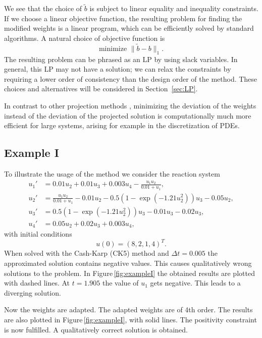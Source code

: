 \documentclass[a4paper]{article}
\numberwithin{equation}{section}
\theoremstyle{plain}
\theoremstyle{definition}
\numberwithin{theorem}{section}
\newcommand{\dt}{{\Delta t}}
\newcommand{\1}{\mathbbm{1}}
\newcommand{\bt}{\tilde{b}}
\begin{document}
We see that the choice of $\bt$ is subject to linear equality and inequality
constraints.  If we choose a linear objective function, the resulting problem
for finding the modified weights is a linear program, which can be efficiently
solved by standard algorithms.  A natural choice of objective function is
$$
\text{minimize } \|\bt - b\|_1.
$$
The resulting problem can be phrased as an LP by using slack variables.
In general, this LP may not have a solution; we can relax the constraints
by requiring a lower order of consistency than the design order of the
method.  These choices and alternatives will be considered in Section~\ref{sec:LP}.

In contrast to other projection methods
\cite{shampine1986conservation,sandu2001positive},
minimizing the deviation of the weights instead of the deviation
of the projected solution is computationally much more efficient
for large systems, arising for example in the discretization of
PDEs.


\subsection{Example I}\label{sec:example_reac}

To illustrate the usage of the method we consider the reaction system
\cite{kopecz_comparison_2019}
\begin{subequations}
\label{eq:Reaction}
\begin{align}
u_1' &= 0.01u_2 + 0.01 u_3 +0.003u_4 - \frac{u_1 u_2}{0.01+u_1}, \\
u_2' &= \frac{u_1u_2}{0.01+u_1}-0.01 u_2-0.5(1-\exp(-1.21 u_2^2)) u_3 -0.05 u_2, \\
u_3' &= 0.5(1-\exp(-1.21u_2^2)) u_3 - 0.01 u_3 -0.02 u_3, \\
u_4' &=0.05 u_2 + 0.02 u_3 + 0.003u_4,
\end{align}
\end{subequations}
with initial conditions
\begin{equation}
u(0) = (8,2,1,4)^T.
\end{equation}
When solved with the Cash-Karp (CK5) \cite{cash1990variable} method and $\dt = 0.005$ the approximated solution contains negative values. This causes qualitatively wrong solutions to the problem.
In Figure\,\ref{fig:exampleI} the obtained results are plotted with dashed lines.
At $t=1.905$ the value of $u_1$ gets negative. This leads to a diverging solution.

Now the weights are adapted. The adapted weights are of 4th order. The results are also plotted in Figure\,\ref{fig:exampleI}, with solid lines.
The positivity constraint is now fulfilled. A qualitatively correct solution is obtained.
\end{document}
